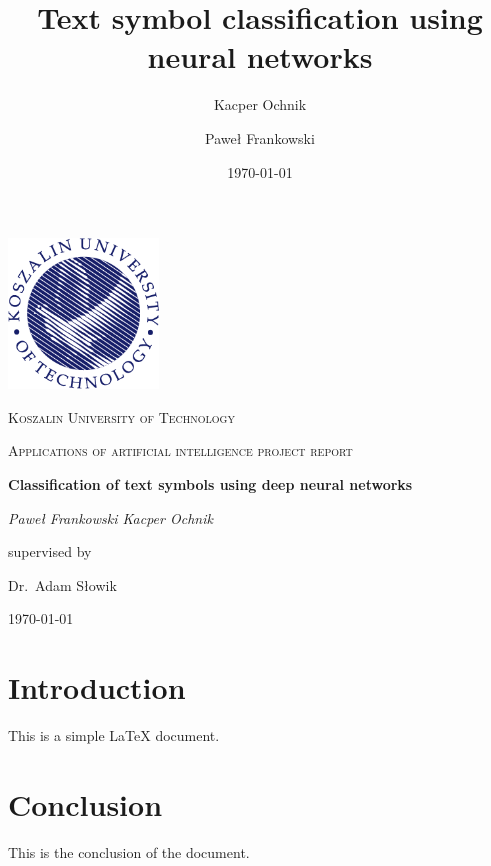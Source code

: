 \documentclass{article}
\title{Text symbol classification using neural networks}
\author{Kacper Ochnik \and Paweł Frankowski}
\date{\today}
\begin{document}
\begin{titlepage}
	\centering
	\includegraphics[width=0.3\textwidth]{Logo_PK_kolor_EN_PNG.png}\par\vspace{1cm}
	{\textsc{Koszalin University of Technology} \par}
	\vspace{1cm}
	{\Large \textsc{Applications of artificial intelligence project report}\par}
	\vspace{1.5cm}
	{\huge\bfseries Classification of text symbols using deep neural networks\par}
	\vspace{2cm}
	{\Large\itshape {Paweł Frankowski \space Kacper Ochnik}\par}
	\vfill
	supervised by\par
	Dr.~Adam Słowik

	\vfill

	{\large \today\par}
\end{titlepage}

\tableofcontents
\newpage

\section{Introduction}
This is a simple LaTeX document.

\section{Conclusion}
This is the conclusion of the document.
\end{document}
